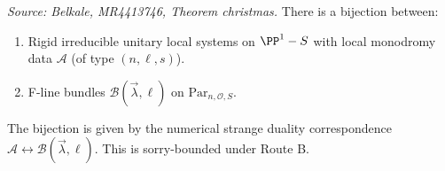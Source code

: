 \begin{lemma}[Christmas]
  \label{lem:christmas}
  \textit{Source: Belkale, MR4413746, Theorem christmas.}
  There is a bijection between:
  \begin{enumerate}
    \item[(A)] Rigid irreducible unitary local systems on \(\PP^1 - S\) with local monodromy data \(\mathcal{A}\) (of type \((n, \ell, s)\)).
    \item[(B)] F-line bundles \(\mathcal{B}(\vec{\lambda}, \ell)\) on \(\mathrm{Par}_{n,\mathcal{O},S}\).
  \end{enumerate}
  The bijection is given by the numerical strange duality correspondence \(\mathcal{A} \leftrightarrow \mathcal{B}(\vec{\lambda}, \ell)\). This is sorry-bounded under Route B.
\end{lemma}

